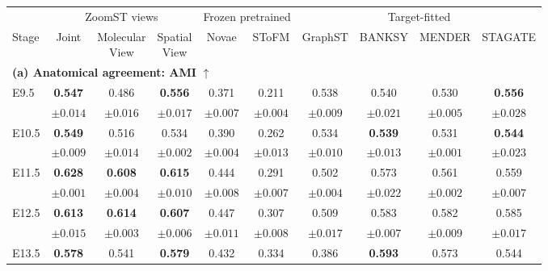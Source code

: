 \begin{tabular}{lccccccccc}
\toprule
 & \multicolumn{3}{c}{ZoomST views} & \multicolumn{2}{c}{Frozen pretrained} & \multicolumn{4}{c}{Target-fitted} \\
\cmidrule(lr){2-4}\cmidrule(lr){5-6}\cmidrule(lr){7-10}
Stage & Joint & \shortstack{Molecular\\View} & \shortstack{Spatial\\View} & Novae & SToFM & GraphST & BANKSY & MENDER & STAGATE \\
\midrule
\multicolumn{10}{l}{\textbf{(a) Anatomical agreement: AMI} $\uparrow$} \\
E9.5 & \textbf{0.547} & 0.486 & \textbf{0.556} & 0.371 & 0.211 & 0.538 & 0.540 & 0.530 & \textbf{0.556} \\
 & {\scriptsize $\pm 0.014$} & {\scriptsize $\pm 0.016$} & {\scriptsize $\pm 0.017$} & {\scriptsize $\pm 0.007$} & {\scriptsize $\pm 0.004$} & {\scriptsize $\pm 0.009$} & {\scriptsize $\pm 0.021$} & {\scriptsize $\pm 0.005$} & {\scriptsize $\pm 0.028$} \\
\addlinespace[2pt]
E10.5 & \textbf{0.549} & 0.516 & 0.534 & 0.390 & 0.262 & 0.534 & \textbf{0.539} & 0.531 & \textbf{0.544} \\
 & {\scriptsize $\pm 0.009$} & {\scriptsize $\pm 0.014$} & {\scriptsize $\pm 0.002$} & {\scriptsize $\pm 0.004$} & {\scriptsize $\pm 0.013$} & {\scriptsize $\pm 0.010$} & {\scriptsize $\pm 0.013$} & {\scriptsize $\pm 0.001$} & {\scriptsize $\pm 0.023$} \\
\addlinespace[2pt]
E11.5 & \textbf{0.628} & \textbf{0.608} & \textbf{0.615} & 0.444 & 0.291 & 0.502 & 0.573 & 0.561 & 0.559 \\
 & {\scriptsize $\pm 0.001$} & {\scriptsize $\pm 0.004$} & {\scriptsize $\pm 0.010$} & {\scriptsize $\pm 0.008$} & {\scriptsize $\pm 0.007$} & {\scriptsize $\pm 0.004$} & {\scriptsize $\pm 0.022$} & {\scriptsize $\pm 0.002$} & {\scriptsize $\pm 0.007$} \\
\addlinespace[2pt]
E12.5 & \textbf{0.613} & \textbf{0.614} & \textbf{0.607} & 0.447 & 0.307 & 0.509 & 0.583 & 0.582 & 0.585 \\
 & {\scriptsize $\pm 0.015$} & {\scriptsize $\pm 0.003$} & {\scriptsize $\pm 0.006$} & {\scriptsize $\pm 0.011$} & {\scriptsize $\pm 0.008$} & {\scriptsize $\pm 0.017$} & {\scriptsize $\pm 0.007$} & {\scriptsize $\pm 0.009$} & {\scriptsize $\pm 0.017$} \\
\addlinespace[2pt]
E13.5 & \textbf{0.578} & 0.541 & \textbf{0.579} & 0.432 & 0.334 & 0.386 & \textbf{0.593} & 0.573 & 0.544 \\

\end{tabular}

